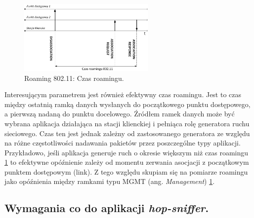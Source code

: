 \begin{figure}[htb]
\begin{center}
\includegraphics[width=250px]{img/RoamingTime}
\caption{Roaming 802.11: Czas roamingu.}
\label{RoamingTime}
\end{center}
\end{figure}

Interesującym parametrem jest również efektywny czas roamingu. Jest to czas między ostatnią ramką danych wysłanych do początkowego punktu dostępowego, a pierwszą nadaną do punktu docelowego. Źródłem ramek danych może być wybrana aplikacja działająca na stacji klienckiej i pełniąca rolę generatora ruchu sieciowego. Czas ten jest jednak zależny od zastosowanego generatora ze względu na różne częstotliwości nadawania pakietów przez poszczególne typy aplikacji. Przykładowo, jeśli aplikacja generuje ruch o okresie większym niż czas roamingu \ref{RoamingTime} to efektywne opóźnienie zależy od momentu zerwania asocjacji z początkowym punktem dostępowym (link). Z tego względu skupiam się na pomiarze roamingu jako opóźnienia między ramkami typu MGMT (ang. \emph{Management}) \ref{RoamingTime}.   

\subsection{Wymagania co do aplikacji \emph{hop-sniffer}.}
\label{sec:ApplicationRequirements}

